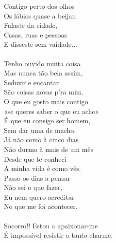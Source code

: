 \documentclass{article}
\begin{document}
Contigo perto dos olhos\\
Os lábios quase a beijar.\\
Falaste da cidade,\\
Casas, ruas e pessoas\\
E disseste sem vaidade... \\
\\
Tenho ouvido muita coisa\\
Mas nunca tão bela assim,\\
Seduzir e encantar\\
São coisas novas p'ra mim.\\
O que eu gosto mais contigo\\
«se queres saber o que eu acho»\\
É que eu consigo ser homem,\\
Sem dar uma de macho.\\
Já não como à cinco dias\\
Não durmo à mais de um mês\\
Desde que te conheci\\
A minha vida é como vês.\\
Passo os dias a pensar\\
Não sei o que fazer,\\
Eu nem quero acreditar\\
No que me foi acontecer. \\
\\
Socorro!! Estou a apaixonar-me\\
É impossível resistir a tanto charme. \\
\end{document}
